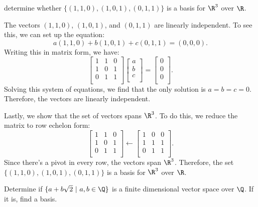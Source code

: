 \begin{problem}[33.2]
  determine whether $\{(1, 1, 0), (1, 0, 1), (0, 1, 1)\}$ is a basis for $\R^3$ over $\R$.
\end{problem}

\begin{solution}
  The vectors $(1, 1, 0)$, $(1, 0, 1)$, and $(0, 1, 1)$ are linearly independent. To see this, we can set up the equation:
  \[%
    a(1, 1, 0) + b(1, 0, 1) + c(0, 1, 1) = (0, 0, 0)
  .\]%
  Writing this in matrix form, we have:
  \[%
    \begin{bmatrix}
      1 & 1 & 0 \\
      1 & 0 & 1 \\
      0 & 1 & 1 \\
    \end{bmatrix}
    \begin{bmatrix}
      a \\
      b \\
      c \\
    \end{bmatrix}
    =
    \begin{bmatrix}
      0 \\
      0 \\
      0 \\
    \end{bmatrix}
   .\]%
  Solving this system of equations, we find that the only solution is $a = b = c = 0$. Therefore, the vectors are linearly independent.

  Lastly, we show that the set of vectors spans $\R^3$. To do this, we reduce the matrix to row echelon form:
  \[%
    \begin{bmatrix}
      1 & 1 & 0 \\
      1 & 0 & 1 \\
      0 & 1 & 1 \\
    \end{bmatrix} \leftarrow
    \begin{bmatrix}
      1 & 0 & 0 \\
      1 & 1 & 1 \\
      0 & 1 & 1 \\
    \end{bmatrix}
  .\]%
  Since there's a pivot in every row, the vectors span $\R^3$. Therefore, the set $\{(1, 1, 0), (1, 0, 1), (0, 1, 1)\}$ is a basis for $\R^3$ over $\R$.
\end{solution}

\begin{problem}[33.5]
  Determine if $\{a + b\sqrt{2}~|~a, b \in \Q\}$ is a finite dimensional vector space over $\Q$. If it is, find a basis.
\end{problem}

